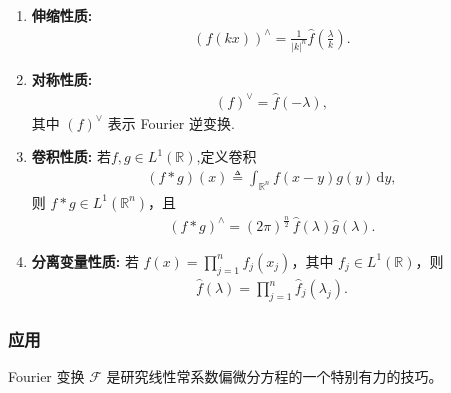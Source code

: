 \documentclass[../../main.tex]{subfiles}
\begin{document}
\begin{proposition}
\begin{enumerate}[(1)]
\item \textbf{伸缩性质:}
\begin{align*}
(f(kx))^\wedge=\frac{1}{|k|^n}\hat{f}\left(\frac{\lambda}{k}\right).
\end{align*}

\item \textbf{对称性质:}
\begin{align*}
(f)^\vee=\hat{f}(-\lambda),
\end{align*}
其中 $(f)^\vee$ 表示 Fourier 逆变换.

\item \textbf{卷积性质:} 若$f,g\in L^1(\mathbb{R})$,定义卷积
\begin{align*}
(f*g)(x)\triangleq\int_{\mathbb{R}^n} f(x-y)g(y)\,\mathrm{d}y,
\end{align*}
则 $f*g\in L^1(\mathbb{R}^n)$，且
\begin{align*}
(f*g)^\wedge=(2\pi)^{\frac{n}{2}}\,\hat{f}(\lambda)\hat{g}(\lambda).
\end{align*}

\item\label{proposition:Fourier 变换的基本性质2-8} \textbf{分离变量性质:} 若 $f(x)=\prod_{j=1}^n f_j(x_j)$，其中 $f_j\in L^1(\mathbb{R})$，则
\begin{align*}
\hat{f}(\lambda)=\prod_{j=1}^n \hat{f}_j(\lambda_j).
\end{align*}
\end{enumerate}
\end{proposition}

\subsubsection{应用}

Fourier 变换 $\mathcal{F}$ 是研究线性常系数偏微分方程的一个特别有力的技巧。
\end{document}
